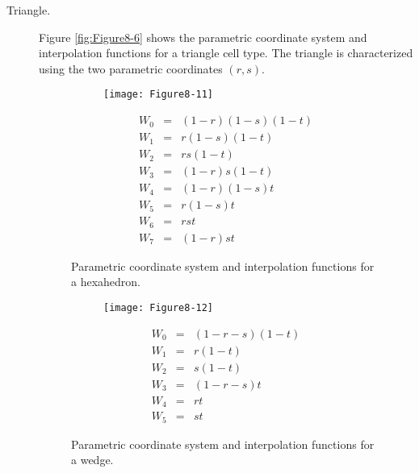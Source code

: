 \begin{description}
    \item[Triangle.] Figure \ref{fig:Figure8-6} shows the parametric coordinate system and interpolation functions for a triangle cell type. The triangle is characterized using the two parametric coordinates $(r,s)$.


    \begin{figure}[!htb]
        \centering
        \begin{subfigure}{0.48\linewidth}
            \centering
            \texttt{[image: Figure8-11]}
            \caption*{}
        \end{subfigure}
        \hfill
        \begin{subfigure}{0.48\linewidth}
            \centering
            \begin{equation*}
            \begin{array}{lll}
            W_0 &=& (1 - r)(1 - s)(1 - t) \\
            W_1 &=& r (1-s)(1 -t) \\
            W_2 &=& rs (1-t) \\
            W_3 &=& (1-r)s(1 - t) \\
            W_4 &=& (1 - r)(1 - s) t \\
            W_5 &=& r (1-s)t \\
            W_6 &=& rs t \\
            W_7 &=& (1-r)st
            \end{array}
            \end{equation*}
        \end{subfigure}%
        \caption{Parametric coordinate system and interpolation functions for a hexahedron.}
        \label{fig:Figure8-11}
    \end{figure}

    \begin{figure}[!htb]
        \centering
        \begin{subfigure}{0.48\linewidth}
            \centering
            \texttt{[image: Figure8-12]}
            \caption*{}
        \end{subfigure}
        \hfill
        \begin{subfigure}{0.48\linewidth}
            \centering
            \begin{equation*}
            \begin{array}{lll}
            W_0 &=& (1 - r - s)(1 - t) \\
            W_1 &=& r (1-t) \\
            W_2 &=& s (1 - t) \\
            W_3 &=& (1 - r - s)t \\
            W_4 &=& r t \\
            W_5 &=& s t
            \end{array}
            \end{equation*}
        \end{subfigure}%
        \caption{Parametric coordinate system and interpolation functions for a wedge.}
        \label{fig:Figure8-12}
    \end{figure}


\end{description}
